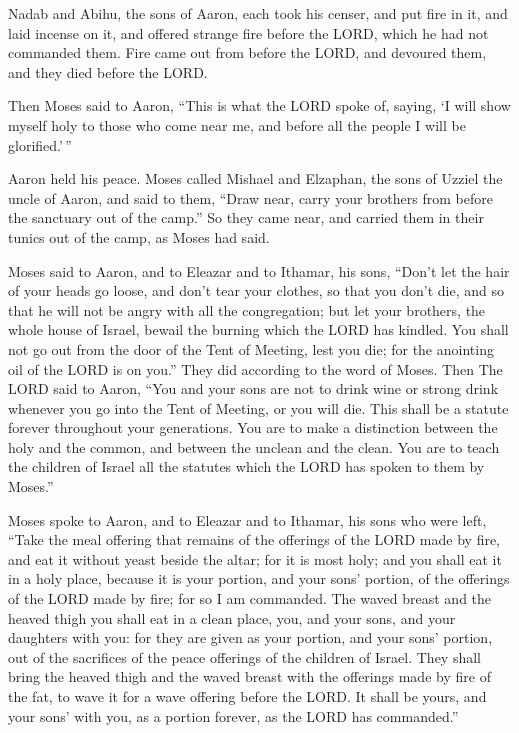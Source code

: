  Nadab and Abihu, the sons of Aaron, each took his censer,
and put fire in it, and laid incense on it, and offered strange fire
before the LORD, which he had not commanded them.  Fire
came out from before the LORD, and devoured them, and they died before
the LORD.

 Then Moses said to Aaron, ``This is what the LORD spoke
of, saying, `I will show myself holy to those who come near me, and
before all the people I will be glorified.'\,''

Aaron held his peace.  Moses called Mishael and Elzaphan,
the sons of Uzziel the uncle of Aaron, and said to them, ``Draw near,
carry your brothers from before the sanctuary out of the camp.''
 So they came near, and carried them in their tunics out
of the camp, as Moses had said.

 Moses said to Aaron, and to Eleazar and to Ithamar, his
sons, ``Don't let the hair of your heads go loose, and don't tear your
clothes, so that you don't die, and so that he will not be angry with
all the congregation; but let your brothers, the whole house of Israel,
bewail the burning which the LORD has kindled.  You shall
not go out from the door of the Tent of Meeting, lest you die; for the
anointing oil of the LORD is on you.'' They did according to the word of
Moses.  Then The LORD said to Aaron,  ``You
and your sons are not to drink wine or strong drink whenever you go into
the Tent of Meeting, or you will die. This shall be a statute forever
throughout your generations.  You are to make a
distinction between the holy and the common, and between the unclean and
the clean.  You are to teach the children of Israel all
the statutes which the LORD has spoken to them by Moses.''

 Moses spoke to Aaron, and to Eleazar and to Ithamar, his
sons who were left, ``Take the meal offering that remains of the
offerings of the LORD made by fire, and eat it without yeast beside the
altar; for it is most holy;  and you shall eat it in a
holy place, because it is your portion, and your sons' portion, of the
offerings of the LORD made by fire; for so I am commanded.
 The waved breast and the heaved thigh you shall eat in a
clean place, you, and your sons, and your daughters with you: for they
are given as your portion, and your sons' portion, out of the sacrifices
of the peace offerings of the children of Israel.  They
shall bring the heaved thigh and the waved breast with the offerings
made by fire of the fat, to wave it for a wave offering before the LORD.
It shall be yours, and your sons' with you, as a portion forever, as the
LORD has commanded.''

